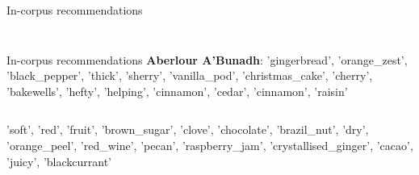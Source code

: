 \documentclass{beamer}
\begin{document}
\begin{frame}{In-corpus recommendations}
\begin{columns}
\begin{column}{0.5\textwidth}
\begin{figure}
\begin{center}
			\end{center}
		\end{figure}
		\end{column}
	\end{columns}


	
\end{frame}

\begin{frame}{In-corpus recommendations}
	\textbf{Aberlour A'Bunadh}: 'gingerbread', 'orange\_zest', 'black\_pepper', 'thick', 'sherry', 'vanilla\_pod', 'christmas\_cake', 'cherry', 'bakewells', 'hefty', 'helping', 'cinnamon', 'cedar', 'cinnamon', 'raisin'
	\begin{columns}
		\begin{column}{0.5\textwidth}
			
			'soft', 'red', 'fruit', 'brown\_sugar', 'clove', 'chocolate', 'brazil\_nut', 'dry', 'orange\_peel', 'red\_wine', 'pecan', 'raspberry\_jam', 'crystallised\_ginger', 'cacao', 'juicy', 'blackcurrant'
			

\end{column}
\end{columns}
\end{frame}
\end{document}
